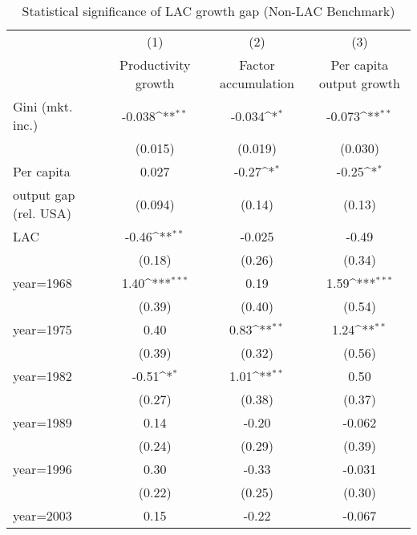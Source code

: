 \begin{sidewaystable}[htbp]\centering
\def\sym#1{\ifmmode^{#1}\else\(^{#1}\)\fi}
\caption{Statistical significance of LAC growth gap (Non-LAC Benchmark)}
\begin{tabular}{l*{3}{c}}
\toprule
                &\multicolumn{1}{c}{(1)}&\multicolumn{1}{c}{(2)}&\multicolumn{1}{c}{(3)}\\
                &\multicolumn{1}{c}{Productivity growth}&\multicolumn{1}{c}{Factor accumulation}&\multicolumn{1}{c}{Per capita output growth}\\
\midrule
Gini (mkt. inc.)&   -0.038\sym{**} &   -0.034\sym{*}  &   -0.073\sym{**} \\
                &  (0.015)         &  (0.019)         &  (0.030)         \\
\addlinespace
Per capita      &    0.027         &    -0.27\sym{*}  &    -0.25\sym{*}  \\
output gap (rel. USA)&  (0.094)         &   (0.14)         &   (0.13)         \\
\addlinespace
LAC             &    -0.46\sym{**} &   -0.025         &    -0.49         \\
                &   (0.18)         &   (0.26)         &   (0.34)         \\
\addlinespace
year=1968       &     1.40\sym{***}&     0.19         &     1.59\sym{***}\\
                &   (0.39)         &   (0.40)         &   (0.54)         \\
\addlinespace
year=1975       &     0.40         &     0.83\sym{**} &     1.24\sym{**} \\
                &   (0.39)         &   (0.32)         &   (0.56)         \\
\addlinespace
year=1982       &    -0.51\sym{*}  &     1.01\sym{**} &     0.50         \\
                &   (0.27)         &   (0.38)         &   (0.37)         \\
\addlinespace
year=1989       &     0.14         &    -0.20         &   -0.062         \\
                &   (0.24)         &   (0.29)         &   (0.39)         \\
\addlinespace
year=1996       &     0.30         &    -0.33         &   -0.031         \\
                &   (0.22)         &   (0.25)         &   (0.30)         \\
\addlinespace
year=2003       &     0.15         &    -0.22         &   -0.067         \\

\end{tabular}
\end{sidewaystable}
